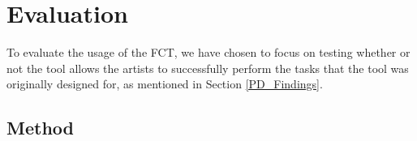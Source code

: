 \section{Evaluation}



To evaluate the usage of the FCT, we have chosen to focus on testing whether or not the tool allows the artists to successfully perform the tasks that the tool was originally designed for, as mentioned in Section \ref{PD_Findings}.



\subsection{Method} \label{method}





%
%
%